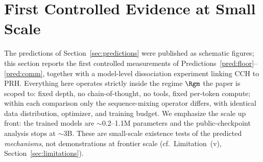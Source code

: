 %
%

\section{First Controlled Evidence at Small Scale}
\label{sec:experiments}

The predictions of Section~\ref{sec:predictions} were published as schematic
figures; this section reports the first controlled measurements of
Predictions~\ref{pred:floor}--\ref{pred:comm}, together with a model-level
dissociation experiment linking CCH to PRH. Everything here operates strictly
inside the regime $\Rgm$ the paper is scoped to: fixed depth, no
chain-of-thought, no tools, fixed per-token compute; within each comparison only
the sequence-mixing operator differs, with identical data distribution,
optimizer, and training budget. We emphasize the scale up front: the trained
models are $\sim$0.2--1.1M parameters and the public-checkpoint analysis stops
at $\sim$3B. These are small-scale existence tests of the predicted
\emph{mechanisms}, not demonstrations at frontier scale
(cf.\ Limitation~(v), Section~\ref{sec:limitations}).

